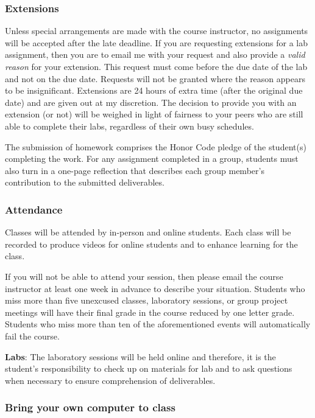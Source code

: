 \documentclass[11pt]{article} %
\begin{document}
\subsubsection*{\textbf{Extensions}}
Unless special arrangements are made with the course instructor, no assignments will be accepted after the late deadline. If you are requesting extensions for a lab assignment, then you are to email me with your request and also provide a \emph{valid reason} for your extension. This request must come before the due date of the lab and not on the due date. Requests will not be granted where the reason appears to be insignificant. Extensions are 24 hours of extra time (after the original due date) and are given out at my discretion. The decision to provide you with an extension (or not) will be weighed in light of fairness to your peers who are still able to complete their labs, regardless of their own busy schedules. 

The submission of homework comprises the Honor Code pledge of the student(s) completing the work. For any assignment completed in a group, students must also turn in a one-page reflection that describes each group member's contribution to the submitted deliverables.  


\subsubsection*{\textbf{Attendance}}

Classes will be attended by in-person and online students. Each class will be recorded to produce videos for online students and to enhance learning for the class.


If you will not be able to attend your session, then please email the course instructor at least one week in advance to describe your situation.  Students who miss more than five unexcused classes, laboratory sessions, or group project meetings will have their final grade in the course reduced by one letter grade. Students who miss more than ten of the aforementioned events will automatically fail the course.


\textbf{Labs}: The laboratory sessions will be held online and therefore, it is the student's responsibility to check up on materials for lab and to ask questions when necessary to ensure comprehension of deliverables. 

\subsubsection*{\textbf{Bring your own computer to class}}
\end{document}
